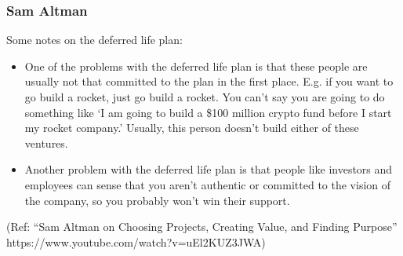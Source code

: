 \begin{frame}[fragile]\frametitle{Sam Altman}

Some notes on the deferred life plan:

\begin{itemize}

\item One of the problems with the deferred life plan is that these people are usually not that committed to the plan in the first place. E.g. if you want to go build a rocket, just go build a rocket. You can’t say you are going to do something like ‘I am going to build a \$100 million crypto fund before I start my rocket company.’ Usually, this person doesn’t build either of these ventures. 
\item Another problem with the deferred life plan is that people like investors and employees can sense that you aren’t authentic or committed to the vision of the company, so you probably won’t win their support.
\end{itemize}

{\tiny (Ref: ``Sam Altman on Choosing Projects, Creating Value, and Finding Purpose'' https://www.youtube.com/watch?v=uEl2KUZ3JWA)}
\end{frame}

